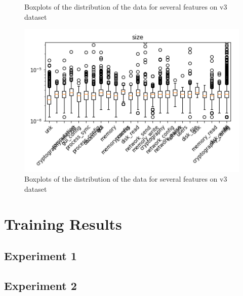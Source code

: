 \begin{appendices}
\begin{figure}[H]
\caption{Boxplots of the distribution of the data for several features on v3 dataset}\label{fig:distribution_analysis7}
\end{figure}




\begin{figure}[H]



%
\centering
\includegraphics[width=0.9\linewidth]{img/boxplots/v3_unbalanced_size.png}
\endminipage


\caption{Boxplots of the distribution of the data for several features on v3 dataset}\label{fig:distribution_analysis8}
\end{figure}





\section{Training Results}\label{annex:models}

\subsection{Experiment 1}



\subsection{Experiment 2}






\end{appendices}
